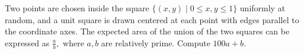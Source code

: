 Two points are chosen inside the square $\{(x, y) \mid 0 \le x, y \le 1\}$ uniformly at random, and a unit square is drawn centered at each point with edges parallel to the coordinate axes. The expected area of the union of the two squares can be expressed as $\frac{a}{b},$ where $a, b$ are relatively prime. Compute $100a + b$.
